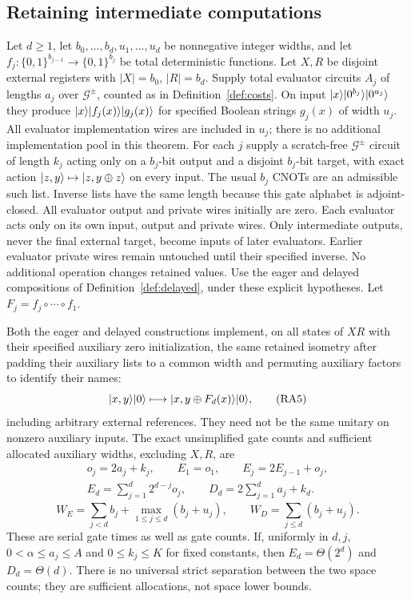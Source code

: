 \subsection{Retaining intermediate computations}

\begin{theorem}
\label{thm:resA-delayed}
Let $d\geq1$, let $b_0,\ldots,b_d,u_1,\ldots,u_d$ be nonnegative
integer widths, and let
$f_j:\{0,1\}^{b_{j-1}}\to\{0,1\}^{b_j}$ be total deterministic
functions. Let $X,R$ be disjoint external registers with
$|X|=b_0$, $|R|=b_d$. Supply total evaluator circuits $A_j$ of lengths
$a_j$ over $\mathcal G^{\pm}$, counted as in Definition~\ref{def:costs}.
On input $\lvert x\rangle\lvert 0^{b_j}\rangle\lvert 0^{u_j}\rangle$ they produce
$\lvert x\rangle\lvert f_j(x)\rangle\lvert g_j(x)\rangle$ for specified Boolean strings
$g_j(x)$ of width $u_j$. All evaluator implementation wires are included
in $u_j$; there is no additional implementation pool in this theorem.
For each $j$ supply a scratch-free $\mathcal G^{\pm}$ circuit of length
$k_j$ acting only on a $b_j$-bit output and a disjoint $b_j$-bit target,
with exact action $\lvert z,y\rangle\mapsto\lvert z,y\oplus z\rangle$ on every input.
The usual $b_j$ CNOTs are an admissible such list. Inverse lists have
the same length because this gate alphabet is adjoint-closed.
All evaluator output and private wires initially are zero.
Each evaluator acts only on its own input, output and private wires.
Only intermediate outputs, never the final external target, become
inputs of later evaluators. Earlier evaluator private wires remain
untouched until their specified inverse. No additional operation changes
retained values. Use the eager and delayed compositions of
Definition~\ref{def:delayed}, under these explicit hypotheses.
Let $F_j=f_j\circ\cdots\circ f_1$.

Both the eager and delayed constructions implement, on all states of
$XR$ with their specified auxiliary zero initialization, the same retained
isometry after padding their auxiliary lists to a common width and
permuting auxiliary factors to identify their names:
\[
 \lvert x,y\rangle\lvert 0\rangle\longmapsto
 \lvert x,y\oplus F_d(x)\rangle\lvert 0\rangle,                         \tag{RA5}
\]
including arbitrary external references. They need not be the same
unitary on nonzero auxiliary inputs. The exact unsimplified gate counts
and sufficient allocated auxiliary widths, excluding $X,R$, are
\[
 \begin{gathered}
 o_j=2a_j+k_j,\qquad E_1=o_1,\qquad E_j=2E_{j-1}+o_j,\\
 E_d=\sum_{j=1}^d2^{d-j}o_j,\qquad
 D_d=2\sum_{j=1}^da_j+k_d.                            \tag{RA6}
 \end{gathered}
\]
\[
 W_E=\sum_{j<d}b_j+\max_{1\leq j\leq d}(b_j+u_j),
 \qquad W_D=\sum_{j\leq d}(b_j+u_j).                 \tag{RA7}
\]
These are serial gate times as well as gate counts. If, uniformly in
$d,j$, $0<\alpha\leq a_j\leq A$ and $0\leq k_j\leq K$ for fixed
constants, then $E_d=\Theta(2^d)$ and $D_d=\Theta(d)$.
There is no universal strict separation between the two space counts;
they are sufficient allocations, not space lower bounds.


\end{theorem}
